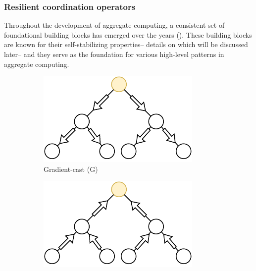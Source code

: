 \subsubsection{Resilient coordination operators}
\label{sec:field-calculus-building-blocks}
Throughout the development of aggregate computing, 
 a consistent set of foundational building blocks has emerged over the years (). 
 These building blocks are known for their self-stabilizing properties--
 details on which will be discussed later--
 and they serve as the foundation for various high-level patterns in aggregate computing.
\begin{figure}
    \begin{subfigure}{0.3\textwidth}
        \centering
        \includegraphics[width=\textwidth]{chapters/img/g.drawio.pdf}
        \caption{Gradient-cast (G)}\label{fig:gradient-cast}
    \end{subfigure}
    \begin{subfigure}{0.3\textwidth}
        \centering
        \includegraphics[width=\textwidth]{chapters/img/c.drawio.pdf}

\end{subfigure}
\end{figure}
